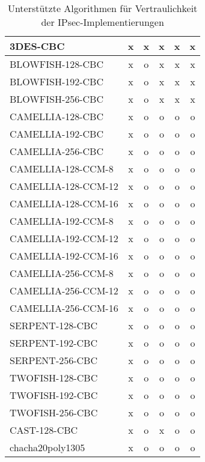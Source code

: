 \begin{center}
\begin{table}[h!]
\begin{tabularx}{\textwidth}{|X|c|c|c|c|c|}
3DES-CBC             &  x  & x & x & x & x \\  \hline
BLOWFISH-128-CBC     &  x  & o & x & x & x \\  \hline
BLOWFISH-192-CBC     &  x  & o & x & x & x \\  \hline
BLOWFISH-256-CBC     &  x  & o & x & x & x \\  \hline
CAMELLIA-128-CBC     &  x  & o & o & o & o \\  \hline
CAMELLIA-192-CBC     &  x  & o & o & o & o \\  \hline
CAMELLIA-256-CBC     &  x  & o & o & o & o \\  \hline
CAMELLIA-128-CCM-8   &  x  & o & o & o & o \\  \hline
CAMELLIA-128-CCM-12  &  x  & o & o & o & o \\  \hline
CAMELLIA-128-CCM-16  &  x  & o & o & o & o \\  \hline
CAMELLIA-192-CCM-8   &  x  & o & o & o & o \\  \hline
CAMELLIA-192-CCM-12  &  x  & o & o & o & o \\  \hline
CAMELLIA-192-CCM-16  &  x  & o & o & o & o \\  \hline
CAMELLIA-256-CCM-8   &  x  & o & o & o & o \\  \hline
CAMELLIA-256-CCM-12  &  x  & o & o & o & o \\  \hline
CAMELLIA-256-CCM-16  &  x  & o & o & o & o \\  \hline
SERPENT-128-CBC      &  x  & o & o & o & o \\  \hline
SERPENT-192-CBC      &  x  & o & o & o & o \\  \hline
SERPENT-256-CBC      &  x  & o & o & o & o \\  \hline
TWOFISH-128-CBC      &  x  & o & o & o & o \\  \hline
TWOFISH-192-CBC      &  x  & o & o & o & o \\  \hline
TWOFISH-256-CBC      &  x  & o & o & o & o \\  \hline
CAST-128-CBC         &  x  & o & x & o & o \\  \hline
chacha20poly1305     &  x  & o & o & o & o \\  \hline
\end{tabularx}
\label{tab:IPsec-Implementierungen-Vertraulichkeit-Algorithmen}
\caption{Unterstützte Algorithmen für Vertraulichkeit der IPsec-Implementierungen}
\end{table}


\end{center}
